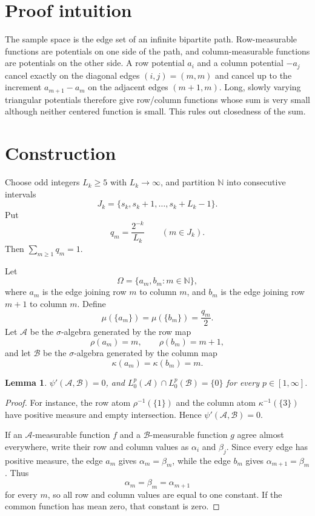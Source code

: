 \documentclass[11pt]{amsart}
\newtheorem{lemma}{Lemma}
\newcommand{\N}{\mathbb N}
\newcommand{\A}{\mathcal A}
\newcommand{\B}{\mathcal B}
\newcommand{\psip}{\psi'}
\begin{document}
\section*{Proof intuition}

The sample space is the edge set of an infinite bipartite path.  Row-measurable
functions are potentials on one side of the path, and column-measurable
functions are potentials on the other side.  A row potential \(a_i\) and a
column potential \(-a_j\) cancel exactly on the diagonal edges \((i,j)=(m,m)\)
and cancel up to the increment \(a_{m+1}-a_m\) on the adjacent edges
\((m+1,m)\).  Long, slowly varying triangular potentials therefore give
row/column functions whose sum is very small although neither centered
function is small.  This rules out closedness of the sum.

\section*{Construction}

Choose odd integers \(L_k\ge 5\) with \(L_k\to\infty\), and partition
\(\N\) into consecutive intervals
\[
  J_k=\{s_k,s_k+1,\ldots,s_k+L_k-1\}.
\]
Put
\[
  q_m=\frac{2^{-k}}{L_k}\qquad(m\in J_k).
\]
Then \(\sum_{m\ge1}q_m=1\).

Let
\[
  \Omega=\{a_m,b_m:m\in\N\},
\]
where \(a_m\) is the edge joining row \(m\) to column \(m\), and \(b_m\) is the
edge joining row \(m+1\) to column \(m\).  Define
\[
  \mu(\{a_m\})=\mu(\{b_m\})=\frac{q_m}{2}.
\]
Let \(\A\) be the \(\sigma\)-algebra generated by the row map
\[
  \rho(a_m)=m,\qquad \rho(b_m)=m+1,
\]
and let \(\B\) be the \(\sigma\)-algebra generated by the column map
\[
  \kappa(a_m)=\kappa(b_m)=m.
\]

\begin{lemma}
\(\psip(\A,\B)=0\), and \(L^p_0(\A)\cap L^p_0(\B)=\{0\}\) for every
\(p\in[1,\infty]\).
\end{lemma}

\begin{proof}
For instance, the row atom \(\rho^{-1}(\{1\})\) and the column atom
\(\kappa^{-1}(\{3\})\) have positive measure and empty intersection.  Hence
\(\psip(\A,\B)=0\).

If an \(\A\)-measurable function \(f\) and a \(\B\)-measurable function \(g\)
agree almost everywhere, write their row and column values as \(\alpha_i\)
and \(\beta_j\).  Since every edge has positive measure, the edge \(a_m\)
gives \(\alpha_m=\beta_m\), while the edge \(b_m\) gives
\(\alpha_{m+1}=\beta_m\).  Thus
\[
  \alpha_m=\beta_m=\alpha_{m+1}
\]
for every \(m\), so all row and column values are equal to one constant.
If the common function has mean zero, that constant is zero.
\end{proof}
\end{document}
